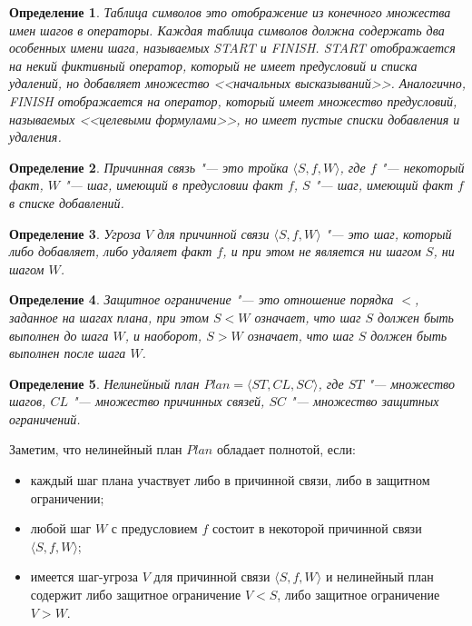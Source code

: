 \documentclass[b5paper,11pt]{book}
\newtheorem{Def}{Определение}
\numberwithin{Def}{section}
\numberwithin{Th}{chapter}
\numberwithin{St}{chapter}
\begin{document}
	\begin{Def}
		Таблица символов это отображение из конечного множества имен шагов в
		операторы. Каждая таблица символов должна содержать два особенных имени шага,
		называемых START и FINISH. START отображается на некий фиктивный оператор, который	не имеет предусловий и списка удалений, но добавляет множество <<начальных высказываний>>. Аналогично, FINISH отображается на оператор, который имеет множество предусловий, называемых <<целевыми формулами>>, но имеет пустые списки добавления и удаления.
	\end{Def} 
	
	\begin{Def}
		Причинная связь "--- это тройка $\langle S, f, W \rangle$, где $f$ "--- некоторый факт, $W$ "--- шаг, имеющий в предусловии факт $f$, $S$ "--- шаг, имеющий факт $f$ в списке добавлений.	
	\end{Def}

	\begin{Def}
		Угроза $V$ для причинной связи $\langle S, f, W\rangle$ "--- это шаг, который либо добавляет, либо удаляет факт $f$, и при этом не является ни шагом $S$, ни шагом $W$.		
	\end{Def}

	\begin{Def}
		Защитное ограничение "--- это отношение порядка $<$, заданное на шагах плана, при этом $S<W$ означает, что шаг $S$ должен быть выполнен до шага $W$, и наоборот, $S>W$ означает, что шаг $S$ должен быть выполнен после шага $W$.		
	\end{Def}

	\begin{Def}
		Нелинейный план $Plan = \langle ST, CL, SC\rangle$, где $ST$ "--- множество шагов, $CL$ "--- множество причинных связей, $SC$ "--- множество защитных ограничений.		
	\end{Def}

	Заметим, что нелинейный план $Plan$ обладает полнотой, если:
	\begin{itemize}
		\item каждый шаг плана участвует либо в причинной связи, либо в защитном ограничении;
		\item любой шаг $W$ с предусловием $f$ состоит в некоторой причинной связи $\langle S, f , W\rangle$;
		\item имеется шаг-угроза $V$ для причинной связи $\langle S, f, W\rangle$ и нелинейный план содержит либо защитное ограничение $V<S$, либо защитное ограничение $V>W$.
	\end{itemize}
		
\end{document}
